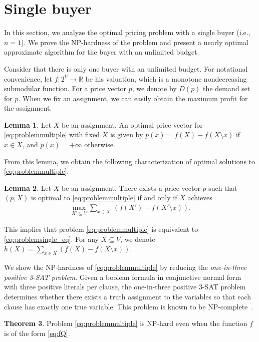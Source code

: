 \documentclass[letterpaper]{article}
\theoremstyle{definition}
\newtheorem{theorem}{Theorem}
\newtheorem{lemma}[theorem]{Lemma}
\begin{document}
\section{Single buyer}
\label{sec:single}

In this section, we analyze the optimal pricing problem with a single buyer (i.e., $n=1$).
We prove the NP-hardness of the problem and present a nearly optimal approximate algorithm for the buyer with an unlimited budget.

Consider that there is only one buyer with an unlimited budget.
For notational convenience, let $f: 2^V \to \mathbb{R}$ be his valuation, which is a monotone nondecreasing submodular function.
For a price vector $p$, we denote by $D(p)$ the demand set for $p$.
When we fix an assignment, we can easily obtain the maximum profit for the assignment.
\begin{lemma}\label{lem:single_obs}
Let $X$ be an assignment.
An optimal price vector for \eqref{eq:problemmultiple} with fixed $X$ is given by
$p(x) = f(X)-f(X \setminus x)$ if $x \in X$, and $p(x)=+\infty$ otherwise.
\end{lemma}
From this lemma, we obtain the following characterization of optimal solutions to \eqref{eq:problemmultiple}.
\begin{lemma}\label{lem:Dtoh}
Let $X$ be an assignment.
There exists a price vector $p$ such that $(p, X)$ is optimal to  \eqref{eq:problemmultiple} if and only if $X$ achieves
\begin{align}\label{eq:problemsingle_eq}
\textstyle
\max_{X' \subseteq V} \sum_{x \in X'} (f(X') - f(X' \setminus x)).
\end{align}
\end{lemma}
This implies that problem \eqref{eq:problemmultiple} is equivalent to \eqref{eq:problemsingle_eq}.
For any $X \subseteq V$, we denote \(h(X) = \sum_{x \in X} (f(X) - f(X \setminus x))\).

We show the NP-hardness of \eqref{eq:problemmultiple} by reducing the \emph{one-in-three positive 3-SAT problem}.
Given a boolean formula in conjunctive normal form with three positive literals per clause, the one-in-three positive 3-SAT problem determines whether there exists a truth assignment to the variables so that each clause has exactly one true variable.
This problem is known to be NP-complete~\cite{schaefer1978complexity}.

\begin{theorem}
\label{thm:NPhard}
Problem \eqref{eq:problemmultiple} is NP-hard even when the function $f$ is of the form \eqref{eq:fQ}.
\end{theorem}
\end{document}
